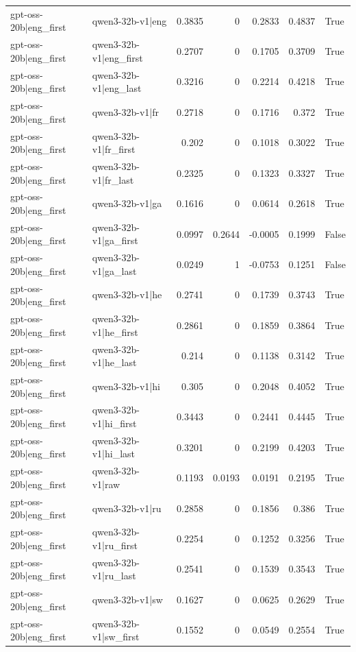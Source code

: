 \begin{table}
\begin{tabular}{l l r r r r l}
gpt-oss-20b|eng_first & qwen3-32b-v1|eng & 0.3835 & 0 & 0.2833 & 0.4837 & True \\
gpt-oss-20b|eng_first & qwen3-32b-v1|eng_first & 0.2707 & 0 & 0.1705 & 0.3709 & True \\
gpt-oss-20b|eng_first & qwen3-32b-v1|eng_last & 0.3216 & 0 & 0.2214 & 0.4218 & True \\
gpt-oss-20b|eng_first & qwen3-32b-v1|fr & 0.2718 & 0 & 0.1716 & 0.372 & True \\
gpt-oss-20b|eng_first & qwen3-32b-v1|fr_first & 0.202 & 0 & 0.1018 & 0.3022 & True \\
gpt-oss-20b|eng_first & qwen3-32b-v1|fr_last & 0.2325 & 0 & 0.1323 & 0.3327 & True \\
gpt-oss-20b|eng_first & qwen3-32b-v1|ga & 0.1616 & 0 & 0.0614 & 0.2618 & True \\
gpt-oss-20b|eng_first & qwen3-32b-v1|ga_first & 0.0997 & 0.2644 & -0.0005 & 0.1999 & False \\
gpt-oss-20b|eng_first & qwen3-32b-v1|ga_last & 0.0249 & 1 & -0.0753 & 0.1251 & False \\
gpt-oss-20b|eng_first & qwen3-32b-v1|he & 0.2741 & 0 & 0.1739 & 0.3743 & True \\
gpt-oss-20b|eng_first & qwen3-32b-v1|he_first & 0.2861 & 0 & 0.1859 & 0.3864 & True \\
gpt-oss-20b|eng_first & qwen3-32b-v1|he_last & 0.214 & 0 & 0.1138 & 0.3142 & True \\
gpt-oss-20b|eng_first & qwen3-32b-v1|hi & 0.305 & 0 & 0.2048 & 0.4052 & True \\
gpt-oss-20b|eng_first & qwen3-32b-v1|hi_first & 0.3443 & 0 & 0.2441 & 0.4445 & True \\
gpt-oss-20b|eng_first & qwen3-32b-v1|hi_last & 0.3201 & 0 & 0.2199 & 0.4203 & True \\
gpt-oss-20b|eng_first & qwen3-32b-v1|raw & 0.1193 & 0.0193 & 0.0191 & 0.2195 & True \\
gpt-oss-20b|eng_first & qwen3-32b-v1|ru & 0.2858 & 0 & 0.1856 & 0.386 & True \\
gpt-oss-20b|eng_first & qwen3-32b-v1|ru_first & 0.2254 & 0 & 0.1252 & 0.3256 & True \\
gpt-oss-20b|eng_first & qwen3-32b-v1|ru_last & 0.2541 & 0 & 0.1539 & 0.3543 & True \\
gpt-oss-20b|eng_first & qwen3-32b-v1|sw & 0.1627 & 0 & 0.0625 & 0.2629 & True \\
gpt-oss-20b|eng_first & qwen3-32b-v1|sw_first & 0.1552 & 0 & 0.0549 & 0.2554 & True \\

\end{tabular}
\end{table}
